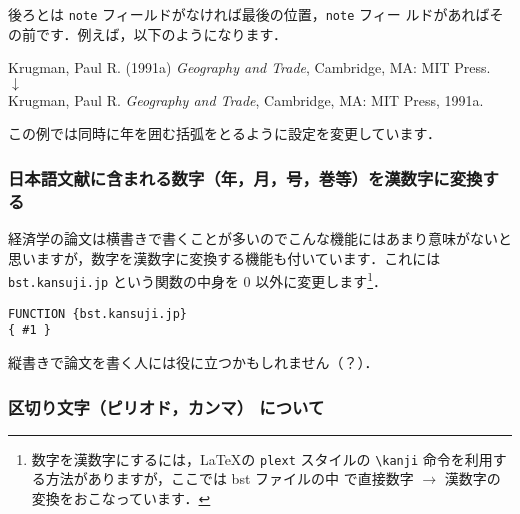 \documentclass[a4j,10pt]{jarticle}
\begin{document}
後ろとは \texttt{note} フィールドがなければ最後の位置，\texttt{note} フィー
ルドがあればその前です．例えば，以下のようになります．
\begin{center}
 Krugman, Paul R. (1991a) \textit{Geography and Trade}, Cambridge, MA:
 MIT Press. \\
 $\downarrow$ \\
 Krugman, Paul R. \textit{Geography and Trade}, Cambridge, MA: MIT Press, 1991a.
\end{center}
この例では同時に年を囲む括弧をとるように設定を変更しています．

\subsubsection{日本語文献に含まれる数字（年，月，号，巻等）を漢数字に変換する}

経済学の論文は横書きで書くことが多いのでこんな機能にはあまり意味がないと
思いますが，数字を漢数字に変換する機能も付いています．これには 
\texttt{bst.kansuji.jp} という関数の中身を 0 以外に変更します\footnote
{数字を漢数字にするには，\LaTeX の \texttt{plext} スタイルの 
\verb|\kanji| 命令を利用する方法がありますが，ここでは bst ファイルの中
で直接数字 $\rightarrow$ 漢数字の変換をおこなっています．}．
\begin{screen}
\begin{verbatim}
FUNCTION {bst.kansuji.jp}
{ #1 }
\end{verbatim}
\end{screen}

縦書きで論文を書く人には役に立つかもしれません（？）．

\subsubsection{区切り文字（ピリオド，カンマ） について}
\end{document}
